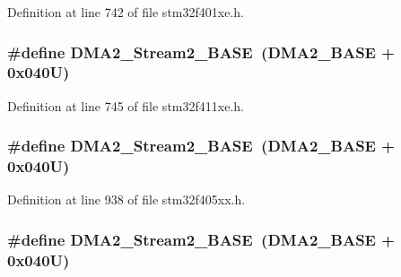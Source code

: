 Definition at line 742 of file stm32f401xe.\+h.

\subsubsection[{\texorpdfstring{D\+M\+A2\+\_\+\+Stream2\+\_\+\+B\+A\+SE}{DMA2_Stream2_BASE}}]{\setlength{\rightskip}{0pt plus 5cm}\#define D\+M\+A2\+\_\+\+Stream2\+\_\+\+B\+A\+SE~({\bf D\+M\+A2\+\_\+\+B\+A\+SE} + 0x040\+U)}\hypertarget{group___peripheral__registers__structures_gaed33a06f08188466f2ede06160984e9a}{}\label{group___peripheral__registers__structures_gaed33a06f08188466f2ede06160984e9a}


Definition at line 745 of file stm32f411xe.\+h.

\subsubsection[{\texorpdfstring{D\+M\+A2\+\_\+\+Stream2\+\_\+\+B\+A\+SE}{DMA2_Stream2_BASE}}]{\setlength{\rightskip}{0pt plus 5cm}\#define D\+M\+A2\+\_\+\+Stream2\+\_\+\+B\+A\+SE~({\bf D\+M\+A2\+\_\+\+B\+A\+SE} + 0x040\+U)}\hypertarget{group___peripheral__registers__structures_gaed33a06f08188466f2ede06160984e9a}{}\label{group___peripheral__registers__structures_gaed33a06f08188466f2ede06160984e9a}


Definition at line 938 of file stm32f405xx.\+h.

\subsubsection[{\texorpdfstring{D\+M\+A2\+\_\+\+Stream2\+\_\+\+B\+A\+SE}{DMA2_Stream2_BASE}}]{\setlength{\rightskip}{0pt plus 5cm}\#define D\+M\+A2\+\_\+\+Stream2\+\_\+\+B\+A\+SE~({\bf D\+M\+A2\+\_\+\+B\+A\+SE} + 0x040\+U)}\hypertarget{group___peripheral__registers__structures_gaed33a06f08188466f2ede06160984e9a}{}\label{group___peripheral__registers__structures_gaed33a06f08188466f2ede06160984e9a}


